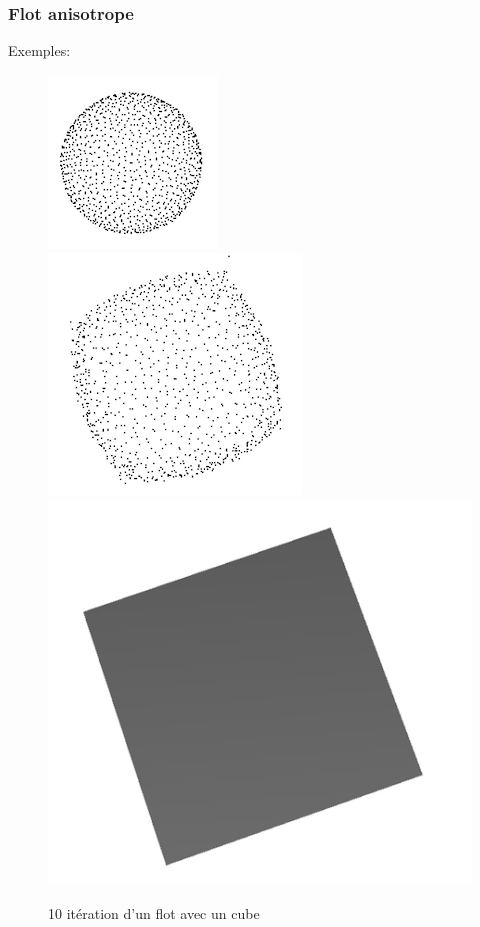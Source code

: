 \documentclass{beamer}
\begin{document}
\begin{frame}[allowframebreaks]
    \frametitle{Flot anisotrope}

    Exemples:
    \begin{figure}
        \centering
        \includegraphics[scale=0.4]{img/sphere-cube-0}
        \includegraphics[scale=0.3]{img/sphere-cube-10}
        \includegraphics[scale=0.2]{img/sphere-cube-cube}
        \caption{10 itération d'un flot avec un cube}
    \end{figure}


\end{frame}
\end{document}
